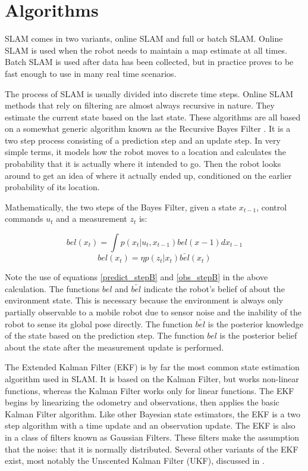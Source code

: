 \documentclass[12pt]{article}
\begin{document}
\section{Algorithms}
SLAM comes in two variants, online SLAM and full or batch SLAM.  Online SLAM is used when the robot needs to maintain a map estimate at all times.  Batch SLAM is used after data has been collected, but in practice proves to be fast enough to use in many real time scenarios.

The process of SLAM is usually divided into discrete time steps.  Online SLAM methods that rely on filtering are almost always recursive in nature.  They estimate the current state based on the last state.  These algorithms are all based on a somewhat generic algorithm known as the Recursive Bayes Filter \cite{ThrunPR2005} \cite{diard2003survey}.  It is a two step process consisting of a prediction step and an update step.  In very simple terms, it models how the robot moves to a location and calculates the probability that it is actually where it intended to go.  Then the robot looks around to get an idea of where it actually ended up, conditioned on the earlier probability of its location.

Mathematically, the two steps of the Bayes Filter, given a state $x_{t-1}$, control commands $u_t$ and a measurement $z_t$ is:

\begin{equation}\label{ekf_predict}
bel(x_t) = \int p(x_t| u_t,x_{t-1}) bel(x-1)dx_{t-1}     
\end{equation}
\begin{equation}\label{ekf_measure}
bel(x_t) =η p(z_t|x_t)\bar{bel}(x_t)                           
\end{equation}

Note the use of equations \ref{predict_stepB} and \ref{obs_stepB} in the above calculation.  The functions $bel$ and $\bar{bel}$ indicate the robot's belief of about the environment state.  This is necessary because the environment is always only partially observable to a mobile robot due to sensor noise and the inability of the robot to sense its global pose directly.  The function $\bar{bel}$ is the posterior knowledge of the state based on the prediction step.  The function $bel$ is the posterior belief about the state after the measurement update is performed.

The Extended Kalman Filter (EKF) is by far the most common state estimation algorithm used in SLAM.  It is based on the Kalman Filter, but works non-linear functions, whereas the Kalman Filter works only for linear functions. The EKF begins by linearizing the odometry and observations, then applies the basic Kalman Filter algorithm.  Like other Bayesian state estimators, the EKF is a two step algorithm with a time update and an observation update. The EKF is also in a class of filters known as Gaussian Filters.  These filters make the assumption that the noise: that it is normally distributed.  Several other variants of the EKF exist, most notably the Unscented Kalman Filter (UKF), discussed in \cite{UKF}.
\end{document}

